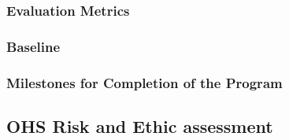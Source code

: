 \documentclass[12pt,a4paper]{article}
\begin{document}
\subsubsection{Evaluation Metrics}
\subsubsection{Baseline}
\subsubsection{Milestones for Completion of the Program}
\subsection{OHS Risk and Ethic assessment}



\end{document}
